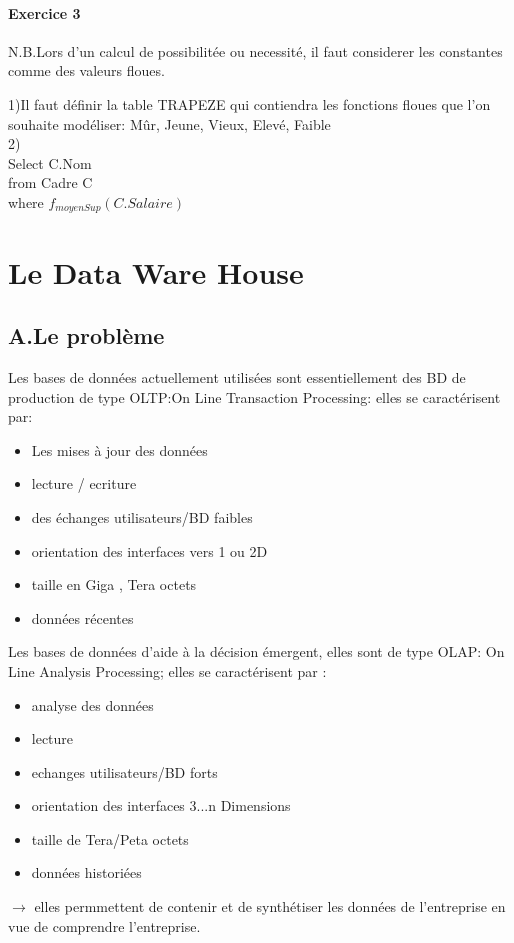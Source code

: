\documentclass[10pt,a4paper]{report}
\begin{document}
\subsection*{Exercice 3}

N.B.Lors d'un calcul de possibilitée ou necessité, il faut considerer les constantes comme des valeurs floues.

1)Il faut définir la table TRAPEZE qui contiendra les fonctions floues que l'on souhaite modéliser: Mûr, Jeune, Vieux, Elevé, Faible\\

2)\\
Select C.Nom\\
from Cadre C\\
where $f_{moyenSup}(C.Salaire)$\\


\part{Le Data Ware House}
\chapter{A.Le problème}
Les bases de données actuellement utilisées sont essentiellement des BD de production de type OLTP:On Line Transaction Processing:
elles se caractérisent par:
\begin{itemize}
\item Les mises à jour des données
\item lecture / ecriture
\item des échanges utilisateurs/BD faibles
\item orientation des interfaces vers 1 ou 2D
\item taille en Giga , Tera octets
\item données récentes
\end{itemize}

Les bases de données d'aide à la décision émergent, elles sont de type OLAP: On Line Analysis Processing; elles se caractérisent par  :
 \begin{itemize}
 \item analyse des données
 \item lecture
 \item echanges utilisateurs/BD forts
 \item orientation des interfaces 3...n Dimensions
 \item taille de Tera/Peta octets
 \item données historiées
 \end{itemize}
$\rightarrow$ elles permmettent de contenir et de synthétiser les données de l'entreprise en vue de comprendre l'entreprise.
\end{document}

